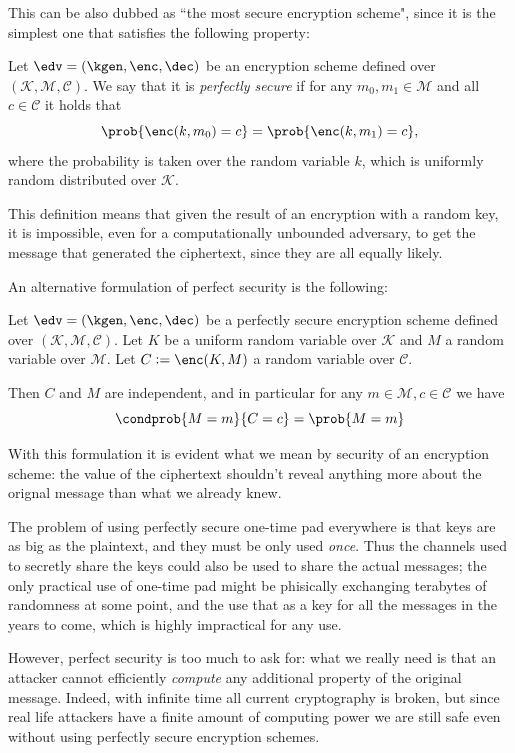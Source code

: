 This can be also dubbed as ``the most secure encryption scheme", since it is the simplest one that satisfies the following property:
\begin{definition}
    Let $\edv=(\kgen,\enc,\dec)$ be an encryption scheme defined over $(\mathcal K, \mathcal M, \mathcal C)$. We say that it is \emph{perfectly secure} if for any $m_0,m_1\in\mathcal M$ and all $c\in\mathcal C$ it holds that 
    $$\prob{\enc(k,m_0)=c} = \prob{\enc(k,m_1)=c},$$
    where the probability is taken over the random variable $k$, which is uniformly random distributed over $\mathcal K$.
\end{definition}

This definition means that given the result of an encryption with a random key, it is impossible, even for a computationally unbounded adversary, to get the message that generated the ciphertext, since they are all equally likely.

An alternative formulation of perfect security is the following:
\begin{proposition}
    Let $\edv=(\kgen,\enc,\dec)$ be a perfectly secure encryption scheme defined over $(\mathcal K, \mathcal M, \mathcal C)$. Let $K$ be a uniform random variable over $\mathcal K$ and $M$ a random variable over $\mathcal M$. Let $C:=\enc(K,M)$ a random variable over $\mathcal C$.
    
    Then $C$ and $M$ are independent, and in particular for any $m\in\mathcal M,c\in\mathcal C$ we have $$\condprob{M=m}{C=c} = \prob{M=m}$$
\end{proposition}

With this formulation it is evident what we mean by security of an encryption scheme: the value of the ciphertext shouldn't reveal anything more about the orignal message than what we already knew.

The problem of using  perfectly secure one-time pad everywhere is that keys are as big as the plaintext, and they must be only used \emph{once}. Thus the channels used to secretly share the keys could also be used to share the actual messages; the only practical use of one-time pad might be phisically exchanging terabytes of randomness at some point, and the use that as a key for all the messages in the years to come, which is highly impractical for any use. 

However, perfect security is too much to ask for: what we really need is that an attacker cannot efficiently \emph{compute} any additional property of the original message. Indeed, with infinite time all current cryptography is broken, but since real life attackers have a finite amount of computing power we are still safe even without using perfectly secure encryption schemes.

